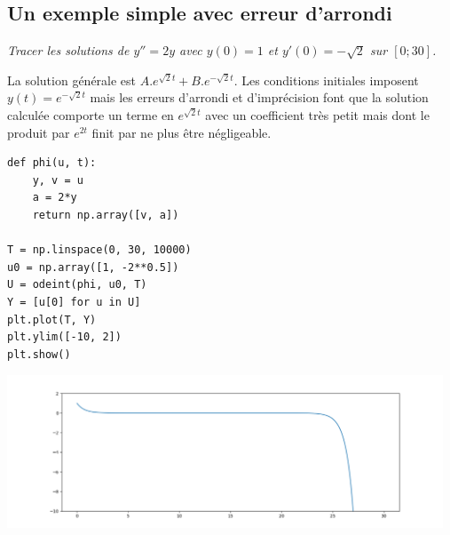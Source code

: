 \subsection{Un exemple simple avec erreur d'arrondi}
\begin{Exercise}[label={exo:EDL2cc}]
\it Tracer les solutions de 
$y'' = 2y$ avec $y(0)=1$ et $y'(0) = -\sqrt 2$ sur $[0;30]$.
\end{Exercise}
\begin{Answer}
La solution générale est $A.e^{\sqrt 2t} + B.e^{-\sqrt 2 t}$. Les conditions initiales imposent $y(t) = e^{-\sqrt 2t}$ mais les erreurs d'arrondi et d'imprécision font que la solution calculée comporte un terme en $e^{\sqrt 2t}$ avec un coefficient très petit mais dont le produit par $e^{2t}$ finit par ne plus être négligeable.
\begin{lstlisting}
def phi(u, t):
    y, v = u
    a = 2*y
    return np.array([v, a])

T = np.linspace(0, 30, 10000)
u0 = np.array([1, -2**0.5])
U = odeint(phi, u0, T)
Y = [u[0] for u in U]
plt.plot(T, Y)
plt.ylim([-10, 2])
plt.show()
\end{lstlisting}
\begin{center}
\includegraphics[width=13cm]{TP/Images/ED2_erreur.png}
\end{center}
\end{Answer}

